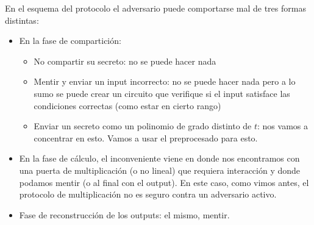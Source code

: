   En el esquema del protocolo el adversario puede comportarse mal de tres formas distintas:
  \begin{itemize}
    \item En la fase de compartición:
      \begin{itemize}
        \item No compartir su secreto: no se puede hacer nada
        \item Mentir y enviar un input incorrecto: no se puede hacer nada pero a lo sumo se puede crear un circuito que verifique
          si el input satisface las condiciones correctas (como estar en cierto rango)
        \item Enviar un secreto como un polinomio de grado distinto de $t$: nos vamos a concentrar en esto.
          Vamos a usar el preprocesado para esto.
      \end{itemize}
    \item En la fase de cálculo, el inconveniente viene en donde nos encontramos con una puerta de multiplicación (o no lineal)
      que requiera interacción y donde podamos mentir (o al final con el output).
      En este caso, como vimos antes, el protocolo de multiplicación no es seguro contra un adversario activo.
    \item Fase de reconstrucción de los outputs: el mismo, mentir.
  \end{itemize}


